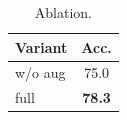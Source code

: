 \begin{table}
\caption{Ablation.}
\begin{tabular}{lc}
\hline
Variant & Acc. \\
\hline
w/o aug & 75.0 \\
full & \textbf{78.3} \\
\hline
\end{tabular}
\end{table}
